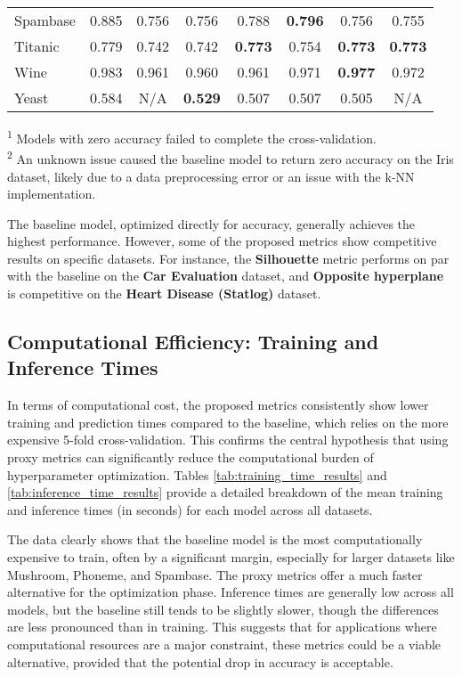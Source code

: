 \documentclass[conference]{IEEEtran}
\begin{document}
\begin{table*}[htbp]
\begin{center}
\begin{tabular}{|l|c|c|c|c|c|c|c|}
Spambase & 0.885 & 0.756 & 0.756 & 0.788 & \textbf{0.796} 
& 0.756 & 0.755 \\
Titanic & 0.779 & 0.742 & 0.742 & \textbf{0.773} & 0.754 & \textbf{0.773} & \textbf{0.773} \\
Wine & 0.983 & 0.961 & 0.960 & 0.961 & 0.971 & \textbf{0.977} & 0.972 \\
Yeast & 0.584 & N/A & \textbf{0.529} & 0.507 & 0.507 & 0.505 & N/A \\
\hline
\end{tabular}
\end{center}
\textsuperscript{1} Models with zero accuracy failed to complete the cross-validation. \\
\textsuperscript{2} An unknown issue caused the baseline model to return zero accuracy on the Iris dataset, likely due to a data preprocessing error or an issue with the k-NN implementation.
\end{table*}

The baseline model, optimized directly for accuracy, generally achieves the highest performance. However, some of the proposed metrics show competitive results on specific datasets. For instance, the \textbf{Silhouette} metric performs on par with the baseline on the \textbf{Car Evaluation} dataset, and \textbf{Opposite hyperplane} is competitive on the \textbf{Heart Disease (Statlog)} dataset.

\subsection{Computational Efficiency: Training and Inference Times}
In terms of computational cost, the proposed metrics consistently show lower training and prediction times compared to the baseline, which relies on the more expensive 5-fold cross-validation. This confirms the central hypothesis that using proxy metrics can significantly reduce the computational burden of hyperparameter optimization. Tables \ref{tab:training_time_results} and \ref{tab:inference_time_results} provide a detailed breakdown of the mean training and inference times (in seconds) for each model across all datasets.

The data clearly shows that the baseline model is the most computationally expensive to train, often by a significant margin, especially for larger datasets like Mushroom, Phoneme, and Spambase. The proxy metrics offer a much faster alternative for the optimization phase. Inference times are generally low across all models, but the baseline still tends to be slightly slower, though the differences are less pronounced than in training. This suggests that for applications where computational resources are a major constraint, these metrics could be a viable alternative, provided that the potential drop in accuracy is acceptable.
\end{document}
